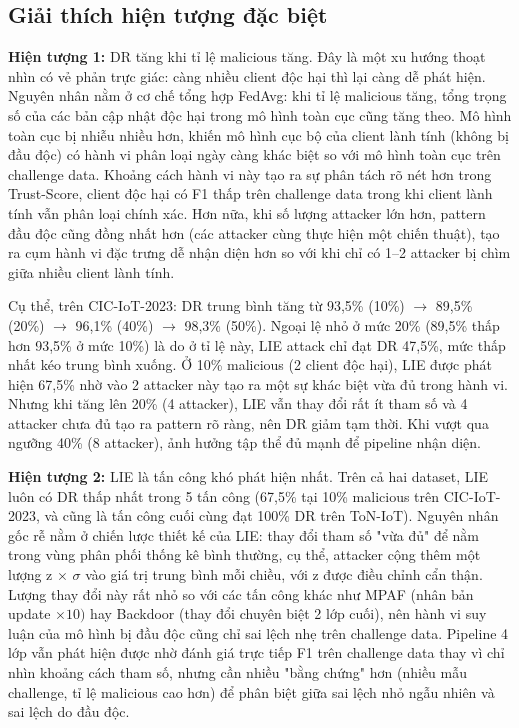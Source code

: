 \subsection{Giải thích hiện tượng đặc biệt}
\textbf{Hiện tượng 1:} DR tăng khi tỉ lệ malicious tăng. Đây là một xu hướng thoạt nhìn có vẻ phản trực giác: càng nhiều client độc hại thì lại càng dễ phát hiện. Nguyên nhân nằm ở cơ chế tổng hợp FedAvg: khi tỉ lệ malicious tăng, tổng trọng số của các bản cập nhật độc hại trong mô hình toàn cục cũng tăng theo. Mô hình toàn cục bị nhiễu nhiều hơn, khiến mô hình cục bộ của client lành tính (không bị đầu độc) có hành vi phân loại ngày càng khác biệt so với mô hình toàn cục trên challenge data. Khoảng cách hành vi này tạo ra sự phân tách rõ nét hơn trong Trust-Score, client độc hại có F1 thấp trên challenge data trong khi client lành tính vẫn phân loại chính xác. Hơn nữa, khi số lượng attacker lớn hơn, pattern đầu độc cũng đồng nhất hơn (các attacker cùng thực hiện một chiến thuật), tạo ra cụm hành vi đặc trưng dễ nhận diện hơn so với khi chỉ có 1--2 attacker bị chìm giữa nhiều client lành tính.

Cụ thể, trên CIC-IoT-2023: DR trung bình tăng từ 93,5\% (10\%) $\rightarrow$ 89,5\% (20\%) $\rightarrow$ 96,1\% (40\%) $\rightarrow$ 98,3\% (50\%). Ngoại lệ nhỏ ở mức 20\% (89,5\% thấp hơn 93,5\% ở mức 10\%) là do ở tỉ lệ này, LIE attack chỉ đạt DR 47,5\%, mức thấp nhất kéo trung bình xuống. Ở 10\% malicious (2 client độc hại), LIE được phát hiện 67,5\% nhờ vào 2 attacker này tạo ra một sự khác biệt vừa đủ trong hành vi. Nhưng khi tăng lên 20\% (4 attacker), LIE vẫn thay đổi rất ít tham số và 4 attacker chưa đủ tạo ra pattern rõ ràng, nên DR giảm tạm thời. Khi vượt qua ngưỡng 40\% (8 attacker), ảnh hưởng tập thể đủ mạnh để pipeline nhận diện.

\textbf{Hiện tượng 2:} LIE là tấn công khó phát hiện nhất. Trên cả hai dataset, LIE luôn có DR thấp nhất trong 5 tấn công (67,5\% tại 10\% malicious trên CIC-IoT-2023, và cũng là tấn công cuối cùng đạt 100\% DR trên ToN-IoT). Nguyên nhân gốc rễ nằm ở chiến lược thiết kế của LIE: thay đổi tham số "vừa đủ" để nằm trong vùng phân phối thống kê bình thường, cụ thể, attacker cộng thêm một lượng z $\times$ $\sigma$ vào giá trị trung bình mỗi chiều, với z được điều chỉnh cẩn thận. Lượng thay đổi này rất nhỏ so với các tấn công khác như MPAF (nhân bản update $\times10)$ hay Backdoor (thay đổi chuyên biệt 2 lớp cuối), nên hành vi suy luận của mô hình bị đầu độc cũng chỉ sai lệch nhẹ trên challenge data. Pipeline 4 lớp vẫn phát hiện được nhờ đánh giá trực tiếp F1 trên challenge data thay vì chỉ nhìn khoảng cách tham số, nhưng cần nhiều "bằng chứng" hơn (nhiều mẫu challenge, tỉ lệ malicious cao hơn) để phân biệt giữa sai lệch nhỏ ngẫu nhiên và sai lệch do đầu độc.

